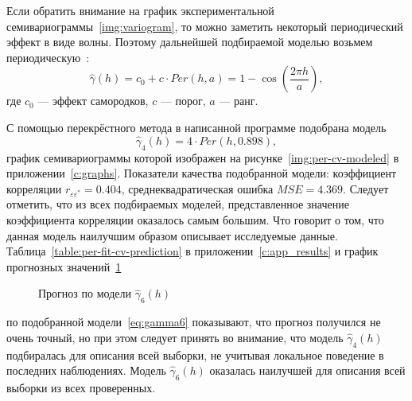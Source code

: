 Если обратить внимание на график экспериментальной семивариограммы~\ref{img:variogram}, то можно заметить некоторый периодический эффект в виде волны. Поэтому дальнейшей подбираемой моделью возьмем периодическую~\cite{pebesma2001gstat}:
\begin{equation}
\label{eq:per}
	\widehat{\gamma}(h) = c_0 + c \cdot Per(h, a) = 1 - \cos(\frac{2 \pi h}{a}),
\end{equation}
где $ c_0 $ --- эффект самородков, $ c $ --- порог, $ a $ --- ранг.

С помощью перекрёстного метода в написанной программе подобрана модель
\begin{equation}
\label{eq:gamma6}
	\widehat{\gamma}_4(h) = 4 \cdot Per(h, 0.898),
\end{equation}
график семивариограммы которой изображен на рисунке~\ref{img:per-cv-modeled} в приложении~\ref{c:graphs}. Показатели качества подобранной модели: коэффициент корреляции $ r_{\varepsilon\varepsilon^{*}} = 0.404 $, среднеквадратическая ошибка $ MSE = 4.369 $. Следует отметить, что из всех подбираемых моделей, представленное значение коэффициента корреляции оказалось самым большим. Что говорит о том, что данная модель наилучшим образом описывает исследуемые данные. Таблица~\ref{table:per-fit-cv-prediction} в приложении~\ref{c:app_results} и график прогнозных значений~\ref{img:per-cv-pred}
\begin{figure}[ht]
\caption{Прогноз по модели $ \widehat{\gamma}_6(h) $}
\label{img:per-cv-pred}
\end{figure}
по подобранной модели~\eqref{eq:gamma6} показывают, что прогноз получился не очень точный, но при этом следует принять во внимание, что модель $ \widehat{\gamma}_4(h) $ подбиралась для описания всей выборки, не учитывая локальное поведение в последних наблюдениях. Модель $ \widehat{\gamma}_6(h) $ оказалась наилучшей для описания всей выборки из всех проверенных.

